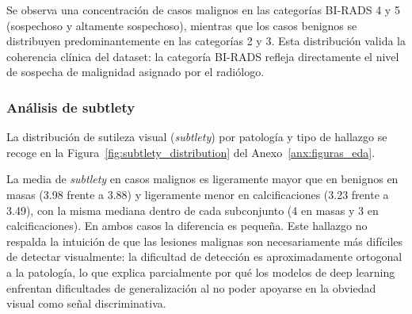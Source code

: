 Se observa una concentración de casos malignos en las
categorías BI-RADS 4 y 5 (sospechoso y altamente
sospechoso), mientras que los casos benignos se
distribuyen predominantemente en las categorías 2 y
3. Esta distribución valida la coherencia clínica del
dataset: la categoría BI-RADS refleja directamente
el nivel de sospecha de malignidad asignado por el
radiólogo.

\subsubsection{Análisis de subtlety}

La distribución de sutileza visual (\textit{subtlety}) por patología
y tipo de hallazgo se recoge en la Figura~\ref{fig:subtlety_distribution}
del Anexo~\ref{anx:figuras_eda}.

La media de \textit{subtlety} en casos malignos es
ligeramente mayor que en benignos en masas (3.98 frente
a 3.88) y ligeramente menor en calcificaciones (3.23
frente a 3.49), con la misma mediana dentro de cada
subconjunto (4 en masas y 3 en calcificaciones). En
ambos casos la diferencia es pequeña.
Este hallazgo no respalda la intuición de que las lesiones
malignas son necesariamente más difíciles de detectar
visualmente: la dificultad de detección es
aproximadamente ortogonal a la patología, lo que
explica parcialmente por qué los modelos de deep
learning enfrentan dificultades de generalización al
no poder apoyarse en la obviedad visual como señal
discriminativa.
